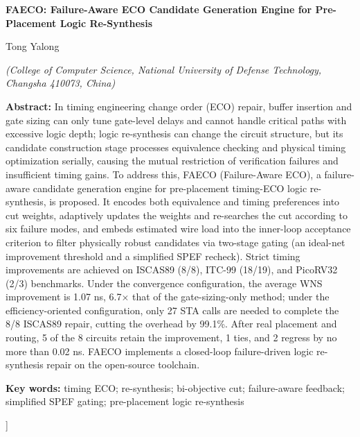 \documentclass[twocolumn,10pt]{ctexart}
\begin{document}
\begin{center}
{\bfseries\fontsize{13.5}{18}\selectfont FAECO: Failure-Aware ECO Candidate Generation Engine for Pre-Placement Logic Re-Synthesis}\par
\vspace{5pt}
{\normalsize Tong Yalong\par}
\vspace{3pt}
{\small \itshape (College of Computer Science, National University of Defense Technology, Changsha 410073, China)}\par
\vspace{6pt}
\end{center}
\begin{flushleft}
{\bfseries Abstract:} {\small In timing engineering change order (ECO) repair, buffer insertion and gate sizing can only tune gate-level delays and cannot handle critical paths with excessive logic depth; logic re-synthesis can change the circuit structure, but its candidate construction stage processes equivalence checking and physical timing optimization serially, causing the mutual restriction of verification failures and insufficient timing gains. To address this, FAECO (Failure-Aware ECO), a failure-aware candidate generation engine for pre-placement timing-ECO logic re-synthesis, is proposed. It encodes both equivalence and timing preferences into cut weights, adaptively updates the weights and re-searches the cut according to six failure modes, and embeds estimated wire load into the inner-loop acceptance criterion to filter physically robust candidates via two-stage gating (an ideal-net improvement threshold and a simplified SPEF recheck). Strict timing improvements are achieved on ISCAS89 (8/8), ITC-99 (18/19), and PicoRV32 (2/3) benchmarks. Under the convergence configuration, the average WNS improvement is 1.07 ns, 6.7$\times$ that of the gate-sizing-only method; under the efficiency-oriented configuration, only 27 STA calls are needed to complete the 8/8 ISCAS89 repair, cutting the overhead by 99.1\%. After real placement and routing, 5 of the 8 circuits retain the improvement, 1 ties, and 2 regress by no more than 0.02 ns. FAECO implements a closed-loop failure-driven logic re-synthesis repair on the open-source toolchain.}\par
\vspace{3pt}
{\bfseries Key words:} {\small timing ECO; re-synthesis; bi-objective cut; failure-aware feedback; simplified SPEF gating; pre-placement logic re-synthesis}\par
\end{flushleft}
]%
\end{document}
